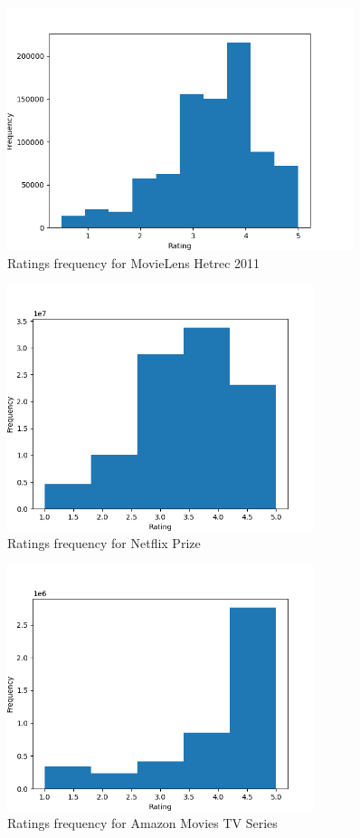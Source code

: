 \begin{figure}[hbt!]
\centering
\includegraphics[width=0.9\textwidth]{pictures/movielens-hetrec-2011-ratings-frequency}
\caption{Ratings frequency for MovieLens Hetrec 2011}
\label{fg:movielens-hetrec-2011-ratings-frequency}
\end{figure}
\begin{figure}[hbt!]
\centering
\includegraphics[width=0.8\textwidth]{pictures/netflix-prize-ratings-frequency}
\caption{Ratings frequency for Netflix Prize}
\label{fg:netflix-prize-ratings-frequency}
\end{figure}
\begin{figure}[hbt!]
\centering
\includegraphics[width=0.8\textwidth]{pictures/amazon-movies-tv-series-ratings-frequency}
\caption{Ratings frequency for Amazon Movies TV Series}
\label{fg:amazon-movies-tv-series-ratings-frequency}
\end{figure}
